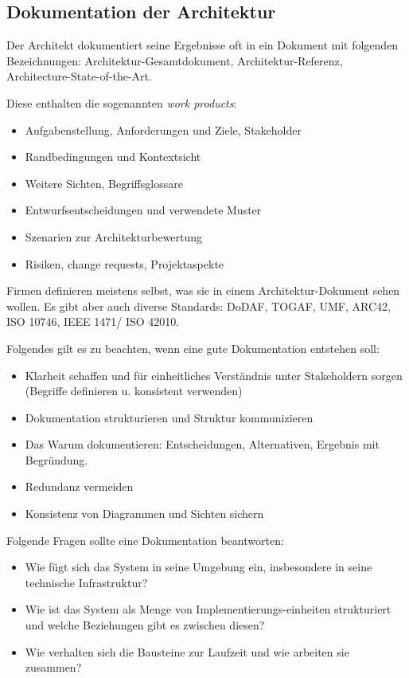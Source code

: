 \subsection{Dokumentation der Architektur}
Der Architekt dokumentiert seine Ergebnisse oft in ein Dokument mit folgenden Bezeichnungen: Architektur-Gesamtdokument, Architektur-Referenz, Architecture-State-of-the-Art.

Diese enthalten die sogenannten \emph{work products}:
\begin{itemize}
	\item Aufgabenstellung, Anforderungen und Ziele, Stakeholder
	\item Randbedingungen und Kontextsicht
	\item Weitere Sichten, Begriffsglossare
	\item Entwurfsentscheidungen und verwendete Muster
	\item Szenarien zur Architekturbewertung
	\item Risiken, change requests, Projektaspekte
\end{itemize}

Firmen definieren meistens selbst, was sie in einem Architektur-Dokument sehen wollen. Es gibt aber auch diverse Standards: DoDAF, TOGAF, UMF, ARC42, ISO 10746, IEEE 1471/ ISO 42010.

Folgendes gilt es zu beachten, wenn eine gute Dokumentation entstehen soll:
\begin{itemize}
	\item Klarheit schaffen und für einheitliches Verständnis unter Stakeholdern sorgen (Begriffe definieren u. konsistent verwenden)
	\item Dokumentation strukturieren und Struktur kommunizieren
	\item Das Warum dokumentieren: Entscheidungen, Alternativen, Ergebnis mit Begründung.
	\item Redundanz vermeiden
	\item Konsistenz von Diagrammen und Sichten sichern
\end{itemize}

Folgende Fragen sollte eine Dokumentation beantworten:
\begin{itemize}
	\item Wie fügt sich das System in seine Umgebung ein, insbesondere in seine technische Infrastruktur?
	\item Wie ist das System als Menge von Implementierungs-einheiten strukturiert und welche Beziehungen gibt es zwischen diesen?
	\item Wie verhalten sich die Bausteine zur Laufzeit und wie arbeiten sie zusammen?
\end{itemize}

